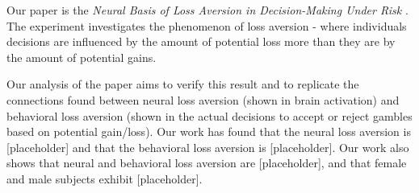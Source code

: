 \par Our paper is the \textit{Neural Basis of Loss Aversion in Decision-Making
Under Risk} \cite{Tom2007LossAversion}. The experiment investigates the 
phenomenon of loss aversion - where individuals decisions are influenced by the
amount of potential loss more than they are by the amount of potential gains. 

\par 
Our analysis of the paper aims to verify this result and to replicate the connections found between neural loss aversion (shown in brain activation) and behavioral loss aversion (shown in the actual decisions to accept or reject gambles based on potential gain/loss). Our work has found that the neural loss aversion is [placeholder] and that the behavioral loss aversion is [placeholder]. 
Our work also shows that neural and behavioral loss aversion are [placeholder], and that female and male subjects exhibit [placeholder].

